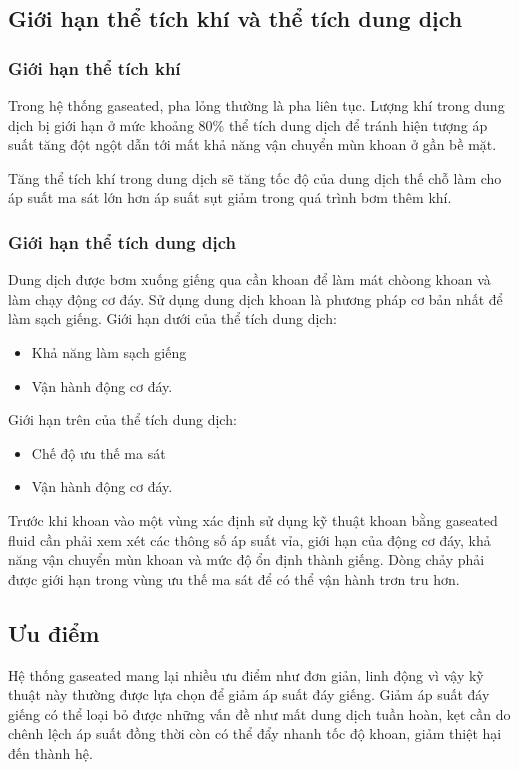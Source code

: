 \documentclass[13pt,a4paper]{article}
\begin{document}
\subsection{Giới hạn thể tích khí và thể tích dung dịch}
	\subsubsection{Giới hạn thể tích khí}
	Trong hệ thống gaseated, pha lỏng thường là pha liên tục. Lượng khí trong dung dịch bị giới hạn ở mức khoảng 80\% thể tích dung dịch để tránh hiện tượng áp suất tăng đột ngột dẫn tới mất khả năng vận chuyển mùn khoan ở gần bề mặt.\par
	Tăng thể tích khí trong dung dịch sẽ tăng tốc độ của dung dịch thế chỗ làm cho áp suất ma sát lớn hơn áp suất sụt giảm trong quá trình bơm thêm khí.
	\subsubsection{Giới hạn thể tích dung dịch}
	Dung dịch được bơm xuống giếng qua cần khoan để làm mát chòong khoan và làm chạy động cơ đáy. Sử dụng dung dịch khoan là phương pháp cơ bản nhất để làm sạch giếng. Giới hạn dưới của thể tích dung dịch:
	\begin{itemize}
		\item Khả năng làm sạch giếng
		\item Vận hành động cơ đáy.
	\end{itemize}
	\par
	Giới hạn trên của thể tích dung dịch:
	\begin{itemize}
		\item Chế độ ưu thế ma sát
		\item Vận hành động cơ đáy.
	\end{itemize}
	\par
	Trước khi khoan vào một vùng xác định sử dụng kỹ thuật khoan bằng gaseated fluid cần phải xem xét các thông số áp suất vỉa, giới hạn của động cơ đáy, khả năng vận chuyển mùn khoan và mức độ ổn định thành giếng. Dòng chảy phải được giới hạn trong vùng ưu thế ma sát để có thể vận hành trơn tru hơn. 
\subsection{Ưu điểm}
Hệ thống gaseated mang lại nhiều ưu điểm như đơn giản, linh động vì vậy kỹ thuật này thường được lựa chọn để giảm áp suất đáy giếng. Giảm áp suất đáy giếng có thể loại bỏ được những vấn đề như mất dung dịch tuần hoàn, kẹt cần do chênh lệch áp suất đồng thời còn có thể đẩy nhanh tốc độ khoan, giảm thiệt hại đến thành hệ. \par
\end{document}
